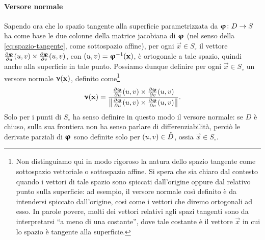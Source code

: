 \paragraph{Versore normale}
Sapendo ora che lo spazio tangente alla superficie parametrizzata da $\vphi\colon D\to S$ ha come base le due colonne della matrice jacobiana di $\vphi$ (nel senso della \eqref{eq:spazio-tangente}, come sottospazio affine), per ogni $\vec x\in S_\circ$ il vettore $\drp{\vphi}{u}(u,v)\times\drp{\vphi}{v}(u,v)$, con $(u,v)=\vphi^{-1}(\vec x)$, è ortogonale a tale spazio, quindi anche alla superficie in tale punto.
Possiamo dunque definire per ogni $\vec x\in S_\circ$ un versore normale $\vnu(\vec x)$, definito come\footnote{
		Non distinguiamo qui in modo rigoroso la natura dello spazio tangente come sottospazio vettoriale o sottospazio affine.
		Si spera che sia chiaro dal contesto quando i vettori di tale spazio sono spiccati dall'origine oppure dal relativo punto sulla superficie: ad esempio, il versore normale cos\`i definito è da intendersi spiccato dall'origine, cos\`i come i vettori che diremo ortogonali ad esso.
		In parole povere, molti dei vettori relativi agli spazi tangenti sono da interpretarsi ``a meno di una costante'', dove tale costante è il vettore $\vec x$ in cui lo spazio è tangente alla superficie.
	}
\begin{equation}
	\vnu(\vec x)=\frac{\drp{\vphi}{u}(u,v)\times\drp{\vphi}{v}(u,v)}{\norm[\big]{\drp{\vphi}{u}(u,v)\times\drp{\vphi}{v}(u,v)}}.
\end{equation}
Solo per i punti di $S_\circ$ ha senso definire in questo modo il versore normale: se $D$ è chiuso, sulla sua frontiera non ha senso parlare di differenziabilità, perciò le derivate parziali di $\vphi$ sono definite solo per $(u,v)\in\interior{D}$, ossia $\vec x\in S_\circ$.
